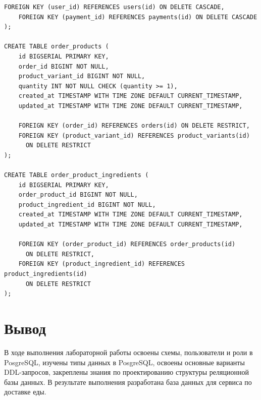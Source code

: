 \documentclass[a4paper,14pt]{extarticle}
\begin{document}
\begin{Verbatim}[tabsize=4,fontsize=\small]
    FOREIGN KEY (user_id) REFERENCES users(id) ON DELETE CASCADE,
    FOREIGN KEY (payment_id) REFERENCES payments(id) ON DELETE CASCADE
);

CREATE TABLE order_products (
    id BIGSERIAL PRIMARY KEY,
    order_id BIGINT NOT NULL,
    product_variant_id BIGINT NOT NULL,
    quantity INT NOT NULL CHECK (quantity >= 1),
    created_at TIMESTAMP WITH TIME ZONE DEFAULT CURRENT_TIMESTAMP,
    updated_at TIMESTAMP WITH TIME ZONE DEFAULT CURRENT_TIMESTAMP,

    FOREIGN KEY (order_id) REFERENCES orders(id) ON DELETE RESTRICT,
    FOREIGN KEY (product_variant_id) REFERENCES product_variants(id)
      ON DELETE RESTRICT
);

CREATE TABLE order_product_ingredients (
    id BIGSERIAL PRIMARY KEY,
    order_product_id BIGINT NOT NULL,
    product_ingredient_id BIGINT NOT NULL,
    created_at TIMESTAMP WITH TIME ZONE DEFAULT CURRENT_TIMESTAMP,
    updated_at TIMESTAMP WITH TIME ZONE DEFAULT CURRENT_TIMESTAMP,

    FOREIGN KEY (order_product_id) REFERENCES order_products(id)
      ON DELETE RESTRICT,
    FOREIGN KEY (product_ingredient_id) REFERENCES product_ingredients(id)
      ON DELETE RESTRICT
);
  \end{Verbatim}

  \section*{Вывод}
  В ходе выполнения лабораторной работы освоены схемы, пользователи и роли в PosgreSQL, изучены типы данных в PosgreSQL, освоены основные варианты DDL-запросов, закреплены знания по проектированию структуры реляционной базы данных. В результате выполнения разработана база данных для сервиса по доставке еды.
\end{document}
